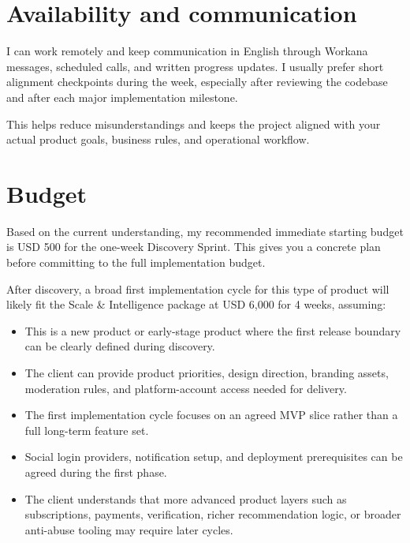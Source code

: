 \documentclass[11pt,a4paper]{article}
\begin{document}
\section*{Availability and communication}

I can work remotely and keep communication in English through Workana messages, scheduled calls, and written progress updates. I usually prefer short alignment checkpoints during the week, especially after reviewing the codebase and after each major implementation milestone.\par

This helps reduce misunderstandings and keeps the project aligned with your actual product goals, business rules, and operational workflow.\par

\section*{Budget}

Based on the current understanding, my recommended immediate starting budget is USD 500 for the one-week Discovery Sprint. This gives you a concrete plan before committing to the full implementation budget.\par

After discovery, a broad first implementation cycle for this type of product will likely fit the Scale \& Intelligence package at USD 6,000 for 4 weeks, assuming:\par

\begin{itemize}
\item This is a new product or early-stage product where the first release boundary can be clearly defined during discovery.
\item The client can provide product priorities, design direction, branding assets, moderation rules, and platform-account access needed for delivery.
\item The first implementation cycle focuses on an agreed MVP slice rather than a full long-term feature set.
\item Social login providers, notification setup, and deployment prerequisites can be agreed during the first phase.
\item The client understands that more advanced product layers such as subscriptions, payments, verification, richer recommendation logic, or broader anti-abuse tooling may require later cycles.
\end{itemize}
\end{document}

